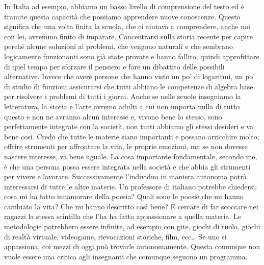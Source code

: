 \documentclass[12pt]{book} %
\begin{document}
In Italia ad esempio, abbiamo un basso livello di comprensione del testo ed è tramite questa capacità che possiamo
apprendere nuove conoscenze. Questo significa che una volta finita la scuola, che ci aiutava a comprendere, anche noi con lei,
avremmo finito di imparare. 
Concentrarsi sulla storia recente per capire perché alcune soluzioni ai
problemi, che vengono naturali e che sembrano logicamente funzionanti sono già state provate e hanno fallito, quindi
approfittare di quel tempo per sforzare il pensiero e fare un dibattito delle possibili alternative. Invece che avere
persone che hanno visto un po' di logaritmi, un po' di studio di funzioni assicurarsi che tutti
abbiano le competenze di algebra base per risolvere i problemi di tutti i giorni. 
Anche se nelle scuole
insegniamo la letteratura, la storia e l'arte avremo adulti a cui non importa nulla di tutto
questo e non ne avranno alcun interesse e, vivono bene lo stesso, sono perfettamente integrate con la società, non
tutti abbiamo gli stessi desideri e va bene così. 
Credo che tutte le materie siano importanti e possano arricchire molto, offrire
strumenti per affrontare la vita, le proprie emozioni, ma se non dovesse nascere interesse, va bene uguale. 
La cosa importante fondamentale, secondo me, è che una persona possa essere integrata nella società e che abbia gli strumenti per vivere e
lavorare. Successivamente l'individuo in maniera autonoma potrà interessarsi di tutte le altre
materie.
Un professore di italiano potrebbe chiedersi: cosa mi ha fatto innamorare della poesia? Quali sono le poesie che mi hanno cambiato la vita? 
Che mi hanno descritto così bene? E cercare di far scoccare nei
ragazzi la stessa scintilla che l'ha ha fatto appassionare a quella materia. 
Le metodologie potrebbero essere infinite, ad esempio con gite, giochi di ruolo, giochi di realtà virtuale,
videogame, rievocazioni storiche, film, ecc… Se uno si appassiona, coi mezzi di oggi può
trovarle autonomamente. Questa comunque non vuole essere una critica agli insegnanti che comunque seguono un programma.
\end{document}
